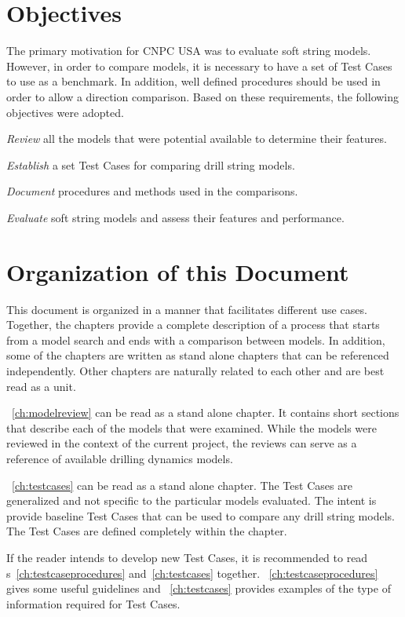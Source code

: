 \section{Objectives}
The primary motivation for CNPC USA was to evaluate soft string models.  However, in order to compare models, it is necessary to have a set of Test Cases to use as a benchmark.  In addition, well defined procedures should be used in order to allow a direction comparison.  Based on these requirements, the following objectives were adopted.
\begin{numberedlist}
	\item \emph{Review} all the models that were potential available to determine their features.
	\item \emph{Establish} a set Test Cases for comparing drill string models.
	\item \emph{Document} procedures and methods used in the comparisons.
	\item \emph{Evaluate} soft string models and assess their features and performance.
\end{numberedlist}

\section{Organization of this Document}
This document is organized in a manner that facilitates different use cases.  Together, the chapters provide a complete description of a process that starts from a model search and ends with a comparison between models.  In addition, some of the chapters are written as stand alone chapters that can be referenced independently.  Other chapters are naturally related to each other and are best read as a unit.

\chaptername~\ref{ch:modelreview} can be read as a stand alone chapter.  It contains short sections that describe each of the models that were examined.  While the models were reviewed in the context of the current project, the reviews can serve as a reference of available drilling dynamics models.

\chaptername~\ref{ch:testcases} can be read as a stand alone chapter.  The Test Cases are generalized and not specific to the particular models evaluated.  The intent is provide baseline Test Cases that can be used to compare any drill string models.  The Test Cases are defined completely within the chapter.

If the reader intends to develop new Test Cases, it is recommended to read \chaptername{}s~\ref{ch:testcaseprocedures} and~\ref{ch:testcases} together.  \chaptername~\ref{ch:testcaseprocedures} gives some useful guidelines and \chaptername~\ref{ch:testcases} provides examples of the type of information required for Test Cases.

